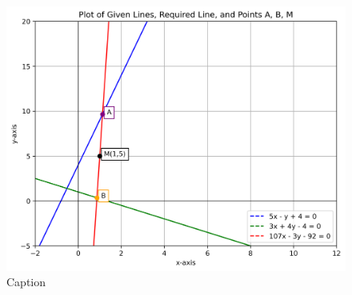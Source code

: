 \documentclass[journal]{IEEEtran}
\begin{document}
\begin{figure}[H]
    \centering
    \includegraphics[width=0.7\columnwidth]{figs/01.png}
    \caption{Caption}
    \label{fig:placeholder}
\end{figure}
\end{document}
